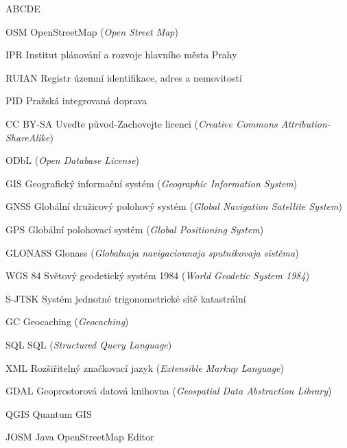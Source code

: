 \begin{seznamzkratek}{ABCDE}

		{OSM}
		{OpenStreetMap (\textit{Open Street Map})}

	    {IPR}
        {Institut plánování a rozvoje hlavního města Prahy}

	    {RUIAN}
        {Registr územní identifikace, adres a nemovitostí}

	    {PID}
        {Pražská integrovaná doprava}

		{CC BY-SA}
		{Uveďte původ-Zachovejte licenci (\textit{Creative Commons Attribution-ShareAlike})}

		{ODbL}
		{(\textit{Open Database License})}

	    {GIS}
 	    {Geografický informační systém  (\textit{Geographic Information System})}

		{GNSS}
		{Globální družicový polohový systém (\textit{Global Navigation Satellite System})}

		{GPS}
		{Globální polohovací systém (\textit{Global Positioning System})}

		{GLONASS}
		{Glonass (\textit{Globalnaja navigacionnaja sputnikovaja sistěma})}

		{WGS 84}
		{Světový geodetický systém 1984 (\textit{World Geodetic System 1984})}

		{S-JTSK}
		{Systém jednotné trigonometrické sítě katastrální}

		{GC}
		{Geocaching (\textit{Geocaching})}

		{SQL}
		{SQL (\textit{Structured Query Language})}

		{XML}
		{Rozšiřitelný značkovací jazyk (\textit{Extensible Markup Language})}

		{GDAL}
		{Geoprostorová datová knihovna (\textit{Geospatial Data Abstraction Library})}

        {QGIS}
        {Quantum GIS}

        {JOSM}
        {Java OpenStreetMap Editor}


\end{seznamzkratek}
